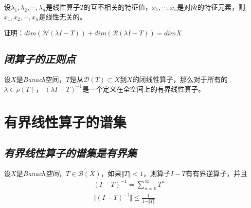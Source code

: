 \begin{mdframed}
    \begin{proposition}
        设$\lambda_1,\lambda_2,\cdots,\lambda_n$是线性算子$T$的互不相关的特征值，$x_1,\cdots,x_n$是对应的特征元素，则$x_1,x_2,\cdots, x_n$是线性无关的。
    \end{proposition}
\end{mdframed}

\begin{mdframed}
    \begin{theorem}
        证明：$dim(\mathcal{N}(\lambda I- T))+dim(\mathcal{R}(\lambda I- T))=dim X$
    \end{theorem}
\end{mdframed}

\subsection*{\textsl{闭算子的正则点}}

\begin{mdframed}
    \begin{theorem}
        设$X$是\textsl{Banach}空间，$T$是从$\mathcal{D}(T)\subset X$到$X$的闭线性算子，那么对于所有的$\lambda\in \rho(T)$，
        $(\lambda I-T)^{-1}$是一个定义在全空间上的有界线性算子。
    \end{theorem}
\end{mdframed}

\section{有界线性算子的谱集}

\subsection*{\textsl{有界线性算子的谱集是有界集}}

\begin{mdframed}
    \begin{theorem}
        设$X$是\textsl{Banach空间}，$T\in \mathcal{B}(X)$，如果$\Vert T\Vert<1$，则算子$I-T$有有界逆算子，并且
        \begin{equation}
            \begin{aligned}
                & (I-T)^{-1}=\sum^{\infty}_{n=0} T^n \\
                & \Vert (I-T)^{-1}\Vert\leqslant \frac{1}{1-\Vert T\Vert}
            \end{aligned}
        \end{equation}
    \end{theorem}
\end{mdframed}

